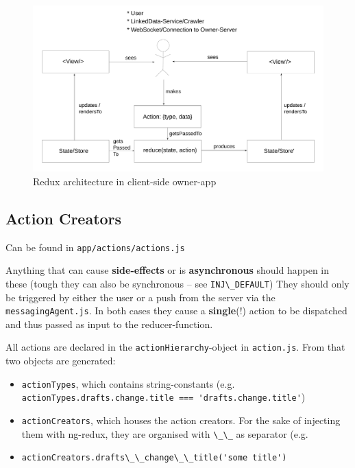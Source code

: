 \documentclass[a4paper,,tablecaptionabove]{scrbook}
\newcommand{\passthrough}[1]{#1}
\providecommand{\tightlist}{%
  \setlength{\itemsep}{0pt}\setlength{\parskip}{0pt}}
\begin{document}
\begin{figure}
\hypertarget{fig:adapted-redux}{%
\centering
\includegraphics{./tex2pdf.11982/b93b469a783e9ff3c749a7cfca53ffdebdb5cae0.pdf}
\caption{Redux architecture in client-side
owner-app}\label{fig:adapted-redux}
}
\end{figure}

\hypertarget{sec:action-creators}{%
\subsection{Action Creators}\label{sec:action-creators}}

Can be found in \passthrough{\lstinline!app/actions/actions.js!}

Anything that can cause \textbf{side-effects} or is
\textbf{asynchronous} should happen in these (tough they can also be
synchronous -- see \passthrough{\lstinline!INJ\_DEFAULT!}) They should
only be triggered by either the user or a push from the server via the
\passthrough{\lstinline!messagingAgent.js!}. In both cases they cause a
\textbf{single}(!) action to be dispatched and thus passed as input to
the reducer-function.

All actions are declared in the
\passthrough{\lstinline!actionHierarchy!}-object in
\passthrough{\lstinline!action.js!}. From that two objects are
generated:

\begin{itemize}
\tightlist
\item
  \passthrough{\lstinline!actionTypes!}, which contains string-constants
  (e.g.
  \passthrough{\lstinline!actionTypes.drafts.change.title === 'drafts.change.title'!})
\item
  \passthrough{\lstinline!actionCreators!}, which houses the action
  creators. For the sake of injecting them with ng-redux, they are
  organised with \passthrough{\lstinline!\_\_!} as separator (e.g.
\item
  \passthrough{\lstinline!actionCreators.drafts\_\_change\_\_title('some title')!}
\end{itemize}
\end{document}
